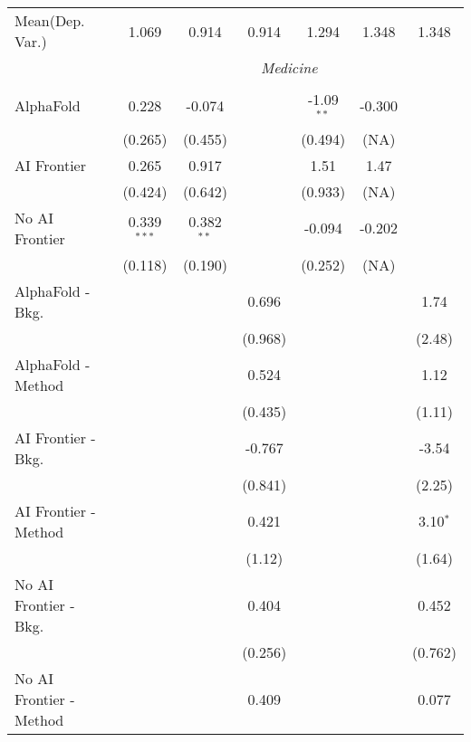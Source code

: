 \begin{tabular}{lcccccc}
Mean(Dep. Var.) & 1.069 & 0.914 & 0.914 & 1.294 & 1.348 & 1.348 \\
 & \multicolumn{6}{c}{\textit{Medicine}} \\ \\
   AlphaFold               & 0.228         & -0.074       &         & -1.09$^{**}$ & -0.300 &   \\   
                           & (0.265)       & (0.455)      &         & (0.494)      & (NA)   &   \\   
   AI Frontier             & 0.265         & 0.917        &         & 1.51         & 1.47   &   \\   
                           & (0.424)       & (0.642)      &         & (0.933)      & (NA)   &   \\   
   No AI Frontier          & 0.339$^{***}$ & 0.382$^{**}$ &         & -0.094       & -0.202 &   \\   
                           & (0.118)       & (0.190)      &         & (0.252)      & (NA)   &   \\   
   AlphaFold - Bkg.        &               &              & 0.696   &              &        & 1.74\\   
                           &               &              & (0.968) &              &        & (2.48)\\   
   AlphaFold - Method      &               &              & 0.524   &              &        & 1.12\\   
                           &               &              & (0.435) &              &        & (1.11)\\   
   AI Frontier - Bkg.      &               &              & -0.767  &              &        & -3.54\\   
                           &               &              & (0.841) &              &        & (2.25)\\   
   AI Frontier - Method    &               &              & 0.421   &              &        & 3.10$^{*}$\\   
                           &               &              & (1.12)  &              &        & (1.64)\\   
   No AI Frontier - Bkg.   &               &              & 0.404   &              &        & 0.452\\   
                           &               &              & (0.256) &              &        & (0.762)\\   
   No AI Frontier - Method &               &              & 0.409   &              &        & 0.077\\   

\end{tabular}
